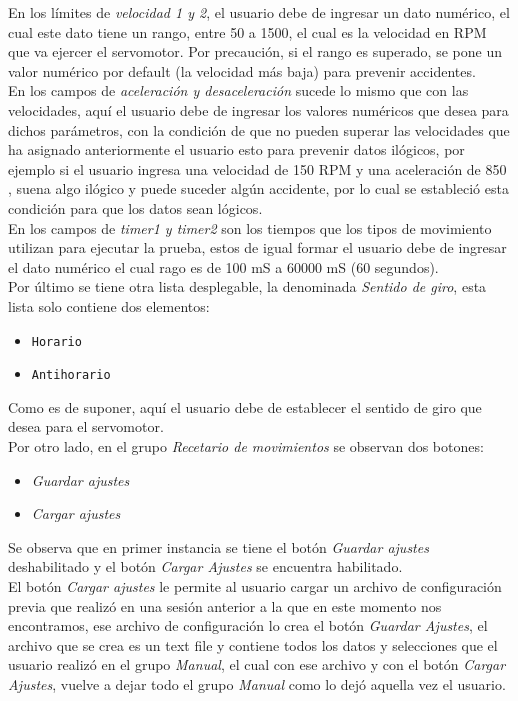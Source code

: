 \documentclass[12pt,titlepage]{article}
\begin{document}
En los límites de \textit{velocidad 1 y 2}, el usuario debe de ingresar un dato numérico, el cual este dato tiene un rango, entre 50 a 1500, el cual es la velocidad en RPM que va ejercer el servomotor. Por precaución, si el rango es superado, se pone un valor numérico por default (la velocidad más baja) para prevenir accidentes. \\ 

En los campos de \textit{aceleración y desaceleración}  sucede lo mismo que con las velocidades, aquí el usuario debe de ingresar los valores numéricos que desea para dichos parámetros, con la condición de que no pueden superar las velocidades que ha asignado anteriormente el usuario esto para prevenir datos ilógicos, por ejemplo si el usuario ingresa una velocidad de 150 RPM y una aceleración de 850 , suena  algo ilógico y puede suceder algún accidente, por lo cual se estableció esta condición para que los datos sean lógicos. \\ 

En los campos de \textit{timer1 y timer2} son los tiempos que los tipos de movimiento utilizan para ejecutar la prueba, estos de igual formar el usuario debe de ingresar el dato numérico el cual rago es de 100 mS a 60000 mS (60 segundos). \\

Por último se tiene otra lista desplegable, la denominada \textit{Sentido de giro}, esta lista solo contiene dos elementos: \\
\begin{itemize}
\item \texttt{Horario}
\item \texttt{Antihorario}
\end{itemize}

Como es de suponer, aquí el usuario debe de establecer el sentido de giro que desea para el servomotor. \\  
 \newpage
 Por otro lado, en el grupo \textit{Recetario de movimientos} se observan dos botones: \\
 \begin{itemize}
 \item \textit{Guardar ajustes}
 \item \textit{Cargar ajustes}
 \end{itemize}
 Se observa que en primer instancia se tiene el botón \textit{Guardar ajustes} deshabilitado y el botón \textit{Cargar Ajustes} se encuentra habilitado. \\ 
 
El botón \textit{Cargar ajustes} le permite al usuario cargar un archivo de configuración previa que realizó en una sesión anterior a la que en este momento nos encontramos, ese archivo de configuración lo crea el botón \textit{Guardar Ajustes}, el archivo que se crea es un text file y contiene todos los datos y selecciones que el usuario realizó en el grupo \textit{Manual}, el cual con ese archivo y con el botón \textit{Cargar Ajustes}, vuelve a dejar todo el grupo \textit{Manual} como lo dejó aquella vez el usuario. \\
\end{document}
